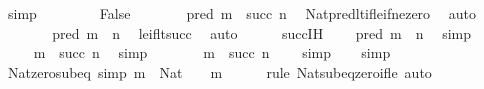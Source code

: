 \begin{isabellebody}
\ simp\isanewline
\ \ \isamarkupfalse%
\isanewline
\ \ \ \ \isamarkupfalse%
\ False\isanewline
\ \ \ \ \isamarkupfalse%
\ \isamarkupfalse%
\ {\isachardoublequoteopen}pred\ m\ {\isacharless}{\kern0pt}\ succ\ n{\isachardoublequoteclose}\ \isamarkupfalse%
\ Nat{\isacharunderscore}{\kern0pt}pred{\isacharunderscore}{\kern0pt}lt{\isacharunderscore}{\kern0pt}if{\isacharunderscore}{\kern0pt}le{\isacharunderscore}{\kern0pt}if{\isacharunderscore}{\kern0pt}ne{\isacharunderscore}{\kern0pt}zero\ \isamarkupfalse%
\ auto\isanewline
\ \ \ \ \isamarkupfalse%
\ \isamarkupfalse%
\ {\isachardoublequoteopen}pred\ m\ {\isasymle}\ n{\isachardoublequoteclose}\ \isamarkupfalse%
\ le{\isacharunderscore}{\kern0pt}if{\isacharunderscore}{\kern0pt}lt{\isacharunderscore}{\kern0pt}succ\ \isamarkupfalse%
\ auto\isanewline
\ \ \ \ \isamarkupfalse%
\ succ{\isachardot}{\kern0pt}IH\ \isamarkupfalse%
\ {\isachardoublequoteopen}{}\ {\isacharequal}{\kern0pt}\ pred\ m\ {\isacharminus}{\kern0pt}\ n{\isachardoublequoteclose}\ \isamarkupfalse%
\ simp\isanewline
\ \ \ \ \isamarkupfalse%
\ \isamarkupfalse%
\ {\isachardoublequoteopen}{\isachardot}{\kern0pt}{\isachardot}{\kern0pt}{\isachardot}{\kern0pt}\ {\isacharequal}{\kern0pt}\ m\ {\isacharminus}{\kern0pt}\ succ\ n{\isachardoublequoteclose}\ \isamarkupfalse%
\ simp\isanewline
\ \ \ \ \isamarkupfalse%
\ \isamarkupfalse%
\ {\isachardoublequoteopen}m\ {\isacharminus}{\kern0pt}\ succ\ n\ {\isacharequal}{\kern0pt}\ {}{\isachardoublequoteclose}\ \isamarkupfalse%
\ simp\isanewline
\ \ \isamarkupfalse%
\isanewline
{}\isamarkupfalse%
\ simp%
\endisatagproof
{\isafoldproof}%
%
\isadelimproof
\isanewline
%
\endisadelimproof
\isanewline
{}\isamarkupfalse%
\ Nat{\isacharunderscore}{\kern0pt}zero{\isacharunderscore}{\kern0pt}sub{\isacharunderscore}{\kern0pt}eq\ {\isacharbrackleft}{\kern0pt}simp{\isacharbrackright}{\kern0pt}{\isacharcolon}{\kern0pt}\ {\isachardoublequoteopen}m\ {\isacharcolon}{\kern0pt}\ Nat\ {\isasymLongrightarrow}\ {}\ {\isacharminus}{\kern0pt}\ m\ {\isacharequal}{\kern0pt}\ {}{\isachardoublequoteclose}\isanewline
%
\isadelimproof
\ \ %
\endisadelimproof
%
\isatagproof
{}\isamarkupfalse%
\ {\isacharparenleft}{\kern0pt}rule\ Nat{\isacharunderscore}{\kern0pt}sub{\isacharunderscore}{\kern0pt}eq{\isacharunderscore}{\kern0pt}zero{\isacharunderscore}{\kern0pt}if{\isacharunderscore}{\kern0pt}le{\isacharparenright}{\kern0pt}\ auto%

\end{isabellebody}
